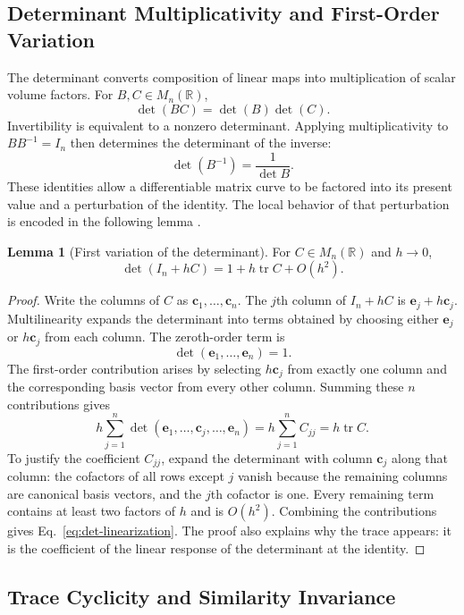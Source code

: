 \documentclass[11pt,a4paper]{article}
\newcommand{\be}{\begin{equation}}
\newcommand{\ee}{\end{equation}}
\newcommand{\lb}[1]{\label{#1}}
\newcommand{\R}{\mathbb{R}}
\DeclareMathOperator{\tr}{tr}
\theoremstyle{definition}
\newtheorem{lemma}{Lemma}[section]
\numberwithin{equation}{section}
\begin{document}
\subsection{Determinant Multiplicativity and First-Order Variation}

The determinant converts composition of linear maps into multiplication of scalar volume factors. For $B,C\in M_n(\R)$,
\be
\det(BC)=\det(B)\det(C).
\lb{eq:det-product}
\ee
Invertibility is equivalent to a nonzero determinant. Applying multiplicativity to $BB^{-1}=I_n$ then determines the determinant of the inverse:
\be
\det(B^{-1})=\frac{1}{\det B}.
\lb{eq:det-inverse}
\ee
These identities allow a differentiable matrix curve to be factored into its present value and a perturbation of the identity. The local behavior of that perturbation is encoded in the following lemma \cite{horn2013}.

\begin{lemma}[First variation of the determinant]
For $C\in M_n(\R)$ and $h\rightarrow0$,
\be
\det(I_n+hC)=1+h\tr C+O(h^2).
\lb{eq:det-linearization}
\ee
\end{lemma}

\begin{proof}
Write the columns of $C$ as $\mathbf c_1,\ldots,\mathbf c_n$. The $j$th column of $I_n+hC$ is $\mathbf e_j+h\mathbf c_j$. Multilinearity expands the determinant into terms obtained by choosing either $\mathbf e_j$ or $h\mathbf c_j$ from each column. The zeroth-order term is
\be
\det(\mathbf e_1,\ldots,\mathbf e_n)=1.
\lb{eq:det-firstvariation-zero}
\ee
The first-order contribution arises by selecting $h\mathbf c_j$ from exactly one column and the corresponding basis vector from every other column. Summing these $n$ contributions gives
\be
h\sum_{j=1}^{n}
\det(\mathbf e_1,\ldots,\mathbf c_j,\ldots,\mathbf e_n)
=
h\sum_{j=1}^{n}C_{jj}
=
h\tr C.
\lb{eq:det-firstvariation-linear}
\ee
To justify the coefficient $C_{jj}$, expand the determinant with column $\mathbf c_j$ along that column: the cofactors of all rows except $j$ vanish because the remaining columns are canonical basis vectors, and the $j$th cofactor is one. Every remaining term contains at least two factors of $h$ and is $O(h^2)$. Combining the contributions gives Eq.~\eqref{eq:det-linearization}. The proof also explains why the trace appears: it is the coefficient of the linear response of the determinant at the identity.
\end{proof}

\subsection{Trace Cyclicity and Similarity Invariance}
\end{document}
